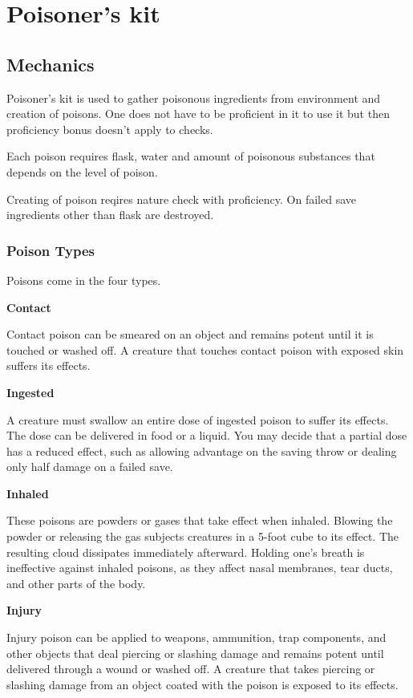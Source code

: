 \chapter{Poisoner's kit}

\section{Mechanics}

Poisoner's kit is used to gather poisonous ingredients from environment and creation of poisons. One does not have to be proficient in it to use it but then proficiency bonus doesn't apply to checks.

Each poison requires flask, water and amount of poisonous substances that depends on the level of poison.

Creating of poison reqires nature check with proficiency. On failed save ingredients other than flask are destroyed.

\subsection{Poison Types}

Poisons come in the four types.

\textbf{Contact}

Contact poison can be smeared on an object and remains potent until it is touched or washed off. A creature that touches contact poison with exposed skin suffers its effects.

\textbf{Ingested}

A creature must swallow an entire dose of ingested poison to suffer its effects. The dose can be delivered in food or a liquid. You may decide that a partial dose has a reduced effect, such as allowing advantage on the saving throw or dealing only half damage on a failed save.

\textbf{Inhaled}

These poisons are powders or gases that take effect when inhaled. Blowing the powder or releasing the gas subjects creatures in a 5-foot cube to its effect. The resulting cloud dissipates immediately afterward. Holding one's breath is ineffective against inhaled poisons, as they affect nasal membranes, tear ducts, and other parts of the body.

\textbf{Injury}

Injury poison can be applied to weapons, ammunition, trap components, and other objects that deal piercing or slashing damage and remains potent until delivered through a wound or washed off. A creature that takes piercing or slashing damage from an object coated with the poison is exposed to its effects.

